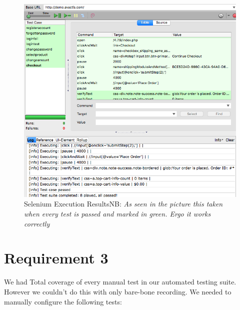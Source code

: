\documentclass[UKenglish,12pt]{article}
\begin{document}
\begin{figure}[H]
	\centering
	\includegraphics[scale=0.7,keepaspectratio]{Images/Selenium-screenshot.png}
	\caption{Selenium Execution Results\newline NB: \textit{As seen in the picture this taken when every test is passed and marked in green. Ergo it works correctly}}
\end{figure}


\section{Requirement 3}
We had Total coverage of every manual test in our automated testing suite. However we couldn't do this with only bare-bone recording. We needed to manually configure the following tests:
\end{document}
